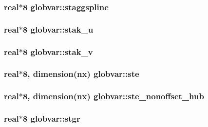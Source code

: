 \subsubsection[{staggspline}]{\setlength{\rightskip}{0pt plus 5cm}real$\ast$8 globvar\+::staggspline}\label{namespaceglobvar_abf2b9f230322f087169e3c845b003237}
\hypertarget{namespaceglobvar_a4f016b27bfa551903a9ff434167e63bb}{}
\subsubsection[{stak\+\_\+u}]{\setlength{\rightskip}{0pt plus 5cm}real$\ast$8 globvar\+::stak\+\_\+u}\label{namespaceglobvar_a4f016b27bfa551903a9ff434167e63bb}
\hypertarget{namespaceglobvar_af534fe32dd8a023b0311416cbffea2f7}{}
\subsubsection[{stak\+\_\+v}]{\setlength{\rightskip}{0pt plus 5cm}real$\ast$8 globvar\+::stak\+\_\+v}\label{namespaceglobvar_af534fe32dd8a023b0311416cbffea2f7}
\hypertarget{namespaceglobvar_a27a2971e4137e1ce57e0f3241a027b28}{}
\subsubsection[{ste}]{\setlength{\rightskip}{0pt plus 5cm}real$\ast$8, dimension({\bf nx}) globvar\+::ste}\label{namespaceglobvar_a27a2971e4137e1ce57e0f3241a027b28}
\hypertarget{namespaceglobvar_a06fc43eda669fded7f4d926b2c06d517}{}
\subsubsection[{ste\+\_\+nonoffset\+\_\+hub}]{\setlength{\rightskip}{0pt plus 5cm}real$\ast$8, dimension({\bf nx}) globvar\+::ste\+\_\+nonoffset\+\_\+hub}\label{namespaceglobvar_a06fc43eda669fded7f4d926b2c06d517}
\hypertarget{namespaceglobvar_aca622d395a1e0e4edb15a47f52e6352f}{}
\subsubsection[{stgr}]{\setlength{\rightskip}{0pt plus 5cm}real$\ast$8 globvar\+::stgr}\label{namespaceglobvar_aca622d395a1e0e4edb15a47f52e6352f}
\hypertarget{namespaceglobvar_afab867a5ed560efb35549138a3645ead}{}
